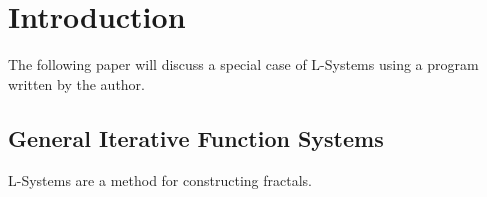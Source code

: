 \section{Introduction}
    The following paper will discuss a special case of L-Systems using a program written by the author.


	\subsection{General Iterative Function Systems}
    L-Systems are a method for constructing fractals. 
